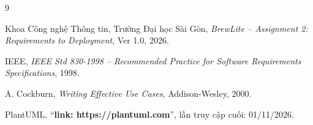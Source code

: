 \documentclass[a4paper]{article}
\begin{document}
\newpage


\newpage


\newpage


\newpage



\newpage




\begin{thebibliography}{9}

Khoa Công nghệ Thông tin, Trường Đại học Sài Gòn,
\textit{BrewLite -- Assignment 2: Requirements to Deployment}, Ver 1.0, 2026.

IEEE, \textit{IEEE Std 830-1998 -- Recommended Practice for Software Requirements Specifications}, 1998.

A. Cockburn, \textit{Writing Effective Use Cases}, Addison-Wesley, 2000.

PlantUML, ``\textbf{link: https://plantuml.com}'', lần truy cập cuối: 01/11/2026.

\end{thebibliography}
\end{document}
